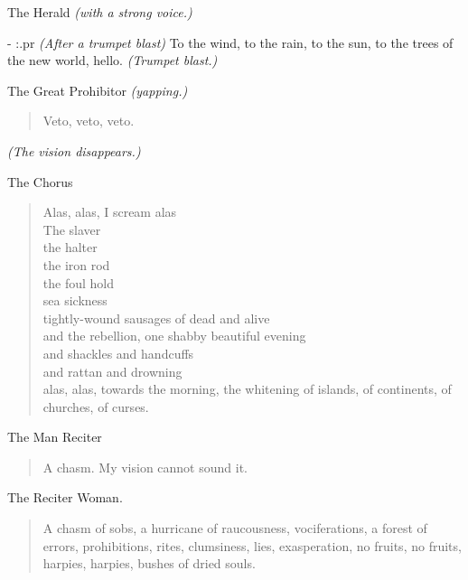 \documentclass[letterpaper,article,12pt,oneside,notitlepage]{memoir}
\begin{document}
\begin{center}The Herald \textit{(with a strong voice.)}\end{center}

- {:.pr} \textit{(After a trumpet blast)} To the wind, to the rain, to the sun, to the trees of the new world, hello. \textit{(Trumpet blast.)}

\begin{center}The Great Prohibitor \textit{(yapping.)}\end{center}

\begin{verse}
Veto, veto, veto.  \\
\end{verse}

\textit{(The vision disappears.)}

\begin{center}The Chorus\end{center}

\begin{verse}
Alas, alas, I scream alas \\
The slaver \\
the halter \\
the iron rod \\
the foul hold \\
sea sickness \\
tightly-wound sausages of dead and alive \\
and the rebellion, one shabby beautiful evening \\
and shackles and handcuffs \\
and rattan and drowning \\
alas, alas, towards the morning, the whitening of islands, of continents, of churches, of curses. \\
\end{verse}

\begin{center}The Man Reciter\end{center}

\begin{verse}
A chasm. My vision cannot sound it. \\
\end{verse}


\begin{center}The Reciter Woman.\end{center}

\begin{verse}
A chasm of sobs, a hurricane of raucousness, vociferations, a forest of errors, prohibitions, rites, clumsiness, lies, exasperation, no fruits, no fruits, harpies, harpies, bushes of dried souls.  \\
\end{verse}
\end{document}
